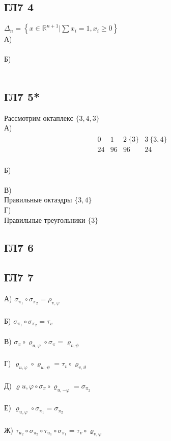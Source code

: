 		\subsection{ГЛ7 4}
		$\Delta_{n}=\left\{x \in \mathbb{R}^{n+1} | \sum x_{i}=1, x_{i} \geqslant 0\right\}$\\
		А)\\
		\\
		Б)\\
		\\
		
		\subsection{ГЛ7 5*}
		Рассмотрим октаплекс $\{3,4,3\}$\\
		А)\\
		\begin{gather*}
			\begin{matrix}
			0 & 1 & 2\ \{3\} & 3\ \{3,4\} \\
			24 & 96 & 96 & 24 
			\end{matrix}
		\end{gather*}
		\\
		Б)\\
		\\
		В)\\
		Правильные октаэдры $\{3,4\}$
		\\
		Г)\\
		Правильные треугольники $\{3\}$
		\\
		
		\subsection{ГЛ7 6}
		
		\subsection{ГЛ7 7}
		А) $\sigma_{\pi_{1}} \circ \sigma_{\pi_{2}}=\rho_{v, \varphi}$\\
		\\
		Б) $\sigma_{\pi_{1}} \circ \sigma_{\pi_{2}}=\tau_{v}$\\
		\\
		В) $\sigma_{\pi} \circ \varrho_{u, \varphi} \circ \sigma_{\pi}=\varrho_{v, \psi}$\\
		\\
		Г) $\varrho_{u, \varphi} \circ \varrho_{w, \psi}=\tau_{v} \circ \varrho_{v, \vartheta}$\\
		\\
		Д) $\varrho u, \varphi \circ \sigma_{\pi} \circ \varrho_{u,-\varphi}=\sigma_{\pi_{2}}$\\
		\\
		Е) $\varrho_{u, \varphi} \circ \sigma_{\pi_{1}}=\sigma_{\pi_{2}}$\\
		\\
		Ж) $\tau_{u_{2}} \circ \sigma_{\pi_{2}} \circ \tau_{u_{1}} \circ \sigma_{\pi_{1}}=\tau_{v} \circ \varrho_{v, \varphi}$\\
		\\
		
